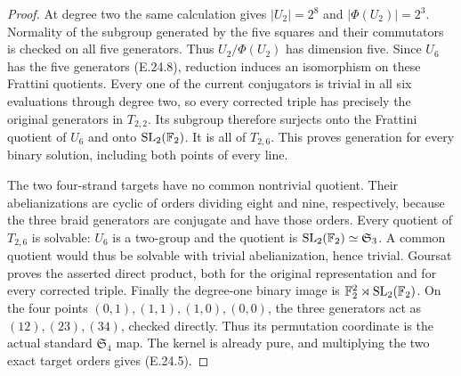 \begin{proof}
At degree two the
same calculation gives
$|U_2|=2^8$ and
$|\Phi(U_2)|=2^3$.
Normality of the subgroup
generated by the five
squares and their
commutators is checked
on all five generators.
Thus $U_2/\Phi(U_2)$
has dimension five.
Since $U_6$ has the
five generators
(E.24.8), reduction
induces an isomorphism
on these Frattini
quotients. Every one
of the current
conjugators is trivial
in all six evaluations
through degree two,
so every corrected
triple has precisely
the original generators
in $T_{2,2}$.
Its subgroup therefore
surjects onto the
Frattini quotient
of $U_6$ and onto
$\mathrm{SL}_2(\mathbb F_2)$.
It is all of $T_{2,6}$.
This proves generation
for every binary
solution, including
both points of every
line.

The two four-strand
targets have no common
nontrivial quotient.
Their abelianizations
are cyclic of orders
dividing eight and
nine, respectively,
because the three
braid generators
are conjugate and
have those orders.
Every quotient of
$T_{2,6}$ is solvable:
$U_6$ is a two-group
and the quotient is
$\mathrm{SL}_2(\mathbb F_2)
\simeq\mathfrak S_3$.
A common quotient
would thus be solvable
with trivial
abelianization, hence
trivial. Goursat
proves the asserted
direct product, both
for the original
representation and
for every corrected
triple. Finally the
degree-one binary
image is
$\mathbb F_2^2\rtimes
\mathrm{SL}_2(\mathbb F_2)$.
On the four points
$(0,1),(1,1),(1,0),(0,0)$,
the three generators
act as $(12),(23),(34)$,
checked directly.
Thus its permutation
coordinate is the
actual standard
$\mathfrak S_4$ map.
The kernel is already
pure, and multiplying
the two exact target
orders gives (E.24.5).
\end{proof}
